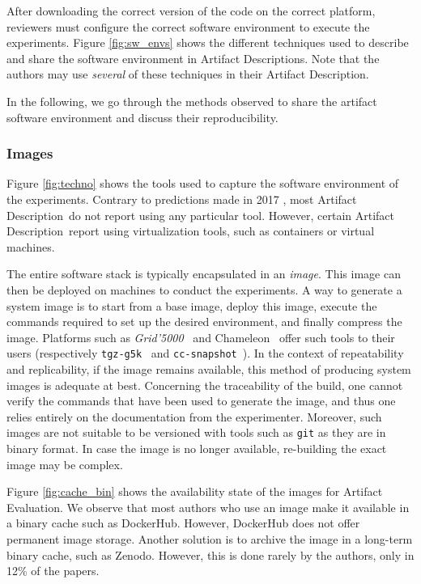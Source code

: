 \documentclass[sigconf,natbib=false]{acmart}
\newcommand{\grid}{\emph{Grid'5000}}
\newcommand{\ad}{Artifact Description}
\newcommand{\aeval}{Artifact Evaluation}
\newcommand{\fmc}[1]{{\color{magenta} #1}} %
\begin{document}
After downloading the correct version of the code on the correct platform, reviewers must configure the correct software environment to execute the experiments.
Figure \ref{fig:sw_envs} shows the different techniques used to describe and share the software environment in \ad s.
Note that the authors may use \emph{several} of these techniques in their \ad.

In the following, we go through the methods observed to share the artifact software environment and discuss their reproducibility.

\subsubsection{Images}\label{sec:sop:sw:images}

Figure \ref{fig:techno} shows the tools used to capture the software environment of the experiments.
Contrary to predictions made in 2017 \cite{silver2017software}, most \ad\ do not report using any particular tool.
However, certain \ad\ report using virtualization tools, such as containers or virtual machines.

The entire software stack is typically encapsulated in an \emph{image}.
This image can then be deployed on machines to conduct the experiments.
A way to generate a system image is to start from a base image, deploy this image, execute the commands required to set up the desired environment, and finally compress the image.
Platforms such as \grid\ \cite{grid5000} and Chameleon\ \cite{chameleon} offer such tools to their users (respectively \texttt{tgz-g5k}\ \cite{tgz-g5k} and \texttt{cc-snapshot}\ \cite{cc-snapshot}).
In the context of repeatability and replicability, if the image remains available, this method of producing system images is adequate at best.
Concerning the traceability of the build, one cannot verify the commands that have been used to generate the image, and thus one relies entirely on the documentation from the experimenter.
Moreover, such images are not suitable to be versioned with tools such as \texttt{git} as they are in binary format.
In case the image is no longer available, re-building the exact image may be complex.

Figure \ref{fig:cache_bin} shows the availability state of the images for \aeval.
We observe that most authors who use an image make it available in a binary cache such as DockerHub. 
However, DockerHub does not offer permanent image storage.
Another solution is to archive the image in a long-term binary cache, such as Zenodo.
However, this is done rarely by the authors, only in 12\% of the papers.
\end{document}
